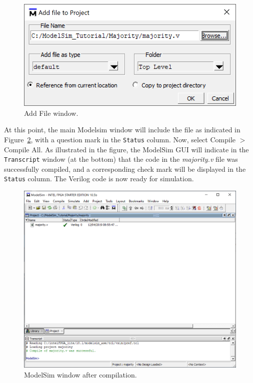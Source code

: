 \documentclass[11pt, twoside, pdftex]{article}
\begin{document}
\begin{figure}[H]
   \begin{center}
      \includegraphics[scale=0.75]{figures/add_file.png}
   \caption{Add File window.} 
	 \label{fig:4}
	 \end{center}
\end{figure}

At this point, the main Modelsim window will include the file as indicated in 
Figure~\ref{fig:6}, with a question mark in the \texttt{Status} column. Now, select
{\sf Compile $>$ Compile All}. As illustrated in the figure, the ModelSim GUI will
indicate in the \texttt{Transcript} window (at the bottom) that the code in the {\it majority.v}
file was successfully compiled, and a corresponding check mark will be displayed in 
the \texttt{Status} column.  The Verilog code is now ready for simulation.

\begin{figure}[H]
   \begin{center}
      \includegraphics[scale=0.75]{figures/compile.png}
   \caption{ModelSim window after compilation.} 
	 \label{fig:6}
	 \end{center}
\end{figure}
\end{document}
